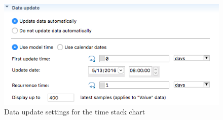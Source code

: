 \begin{figure}[H]
  \centering
  \includegraphics[height=0.3\textwidth]{img/screens/charts/charts4}
  \caption{Data update settings for the time stack chart}
\end{figure}